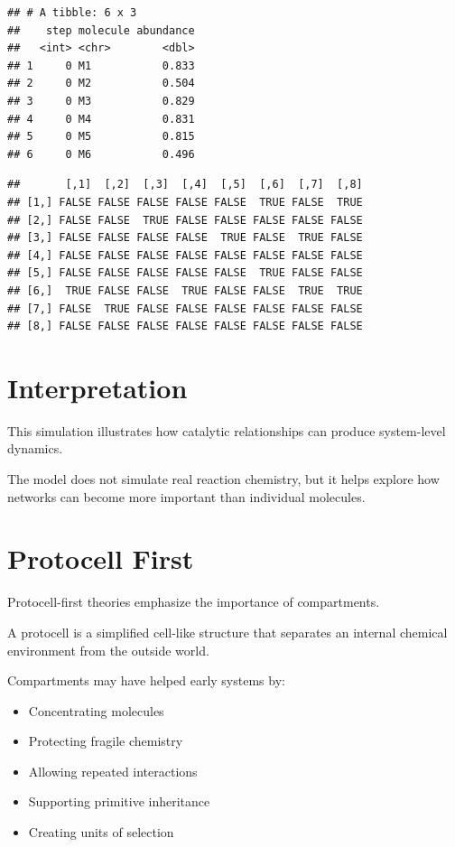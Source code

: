 \documentclass[
  oneside,
  openany]{book}
\newenvironment{Shaded}{\begin{snugshade}}{\end{snugshade}}
\newcommand{\NormalTok}[1]{#1}
\newcommand{\SpecialCharTok}[1]{\textcolor[rgb]{0.81,0.36,0.00}{\textbf{#1}}}
\providecommand{\tightlist}{%
  \setlength{\itemsep}{0pt}\setlength{\parskip}{0pt}}
\begin{document}
\begin{verbatim}
## # A tibble: 6 x 3
##    step molecule abundance
##   <int> <chr>        <dbl>
## 1     0 M1           0.833
## 2     0 M2           0.504
## 3     0 M3           0.829
## 4     0 M4           0.831
## 5     0 M5           0.815
## 6     0 M6           0.496
\end{verbatim}

\begin{Shaded}
\end{Shaded}

\begin{verbatim}
##       [,1]  [,2]  [,3]  [,4]  [,5]  [,6]  [,7]  [,8]
## [1,] FALSE FALSE FALSE FALSE FALSE  TRUE FALSE  TRUE
## [2,] FALSE FALSE  TRUE FALSE FALSE FALSE FALSE FALSE
## [3,] FALSE FALSE FALSE FALSE  TRUE FALSE  TRUE FALSE
## [4,] FALSE FALSE FALSE FALSE FALSE FALSE FALSE FALSE
## [5,] FALSE FALSE FALSE FALSE FALSE  TRUE FALSE FALSE
## [6,]  TRUE FALSE FALSE  TRUE FALSE FALSE  TRUE  TRUE
## [7,] FALSE  TRUE FALSE FALSE FALSE FALSE FALSE FALSE
## [8,] FALSE FALSE FALSE FALSE FALSE FALSE FALSE FALSE
\end{verbatim}

\section{Interpretation}\label{interpretation-1}

This simulation illustrates how catalytic relationships can produce system-level dynamics.

The model does not simulate real reaction chemistry, but it helps explore how networks can become more important than individual molecules.

\section{Protocell First}\label{protocell-first}

Protocell-first theories emphasize the importance of compartments.

A protocell is a simplified cell-like structure that separates an internal chemical environment from the outside world.

Compartments may have helped early systems by:

\begin{itemize}
\tightlist
\item
  Concentrating molecules
\item
  Protecting fragile chemistry
\item
  Allowing repeated interactions
\item
  Supporting primitive inheritance
\item
  Creating units of selection
\end{itemize}
\end{document}
